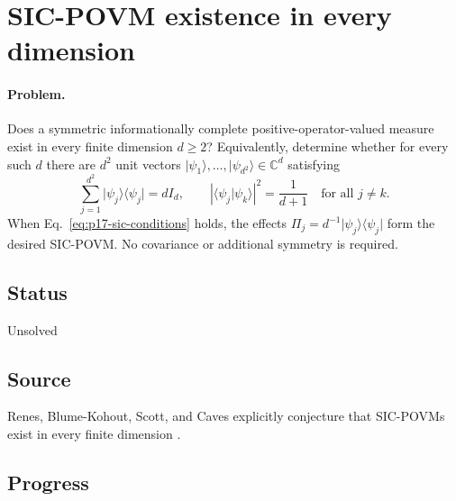 \section{SIC-POVM existence in every dimension}
\label{sec:op_308ac6c848756630}

\paragraph{Problem.}
Does a symmetric informationally complete positive-operator-valued measure
exist in every finite dimension $d\ge2$?  Equivalently, determine whether for
every such $d$ there are $d^2$ unit vectors
$\lvert\psi_1\rangle,\ldots,\lvert\psi_{d^2}\rangle\in\mathbb{C}^d$
satisfying
\begin{equation}
  \sum_{j=1}^{d^2}
    \lvert\psi_j\rangle\!\langle\psi_j\rvert=dI_d,
  \qquad
  \left|\langle\psi_j\vert\psi_k\rangle\right|^2
    =\frac{1}{d+1}
  \quad\text{for all }j\ne k.
  \label{eq:p17-sic-conditions}
\end{equation}
When Eq.~\eqref{eq:p17-sic-conditions} holds, the effects
$\Pi_j=d^{-1}\lvert\psi_j\rangle\!\langle\psi_j\rvert$ form the desired
SIC-POVM.  No covariance or additional symmetry is required.

\subsection*{Status}

Unsolved

\subsection*{Source}

Renes, Blume-Kohout, Scott, and Caves explicitly conjecture that SIC-POVMs
exist in every finite dimension .

\subsection*{Progress}

